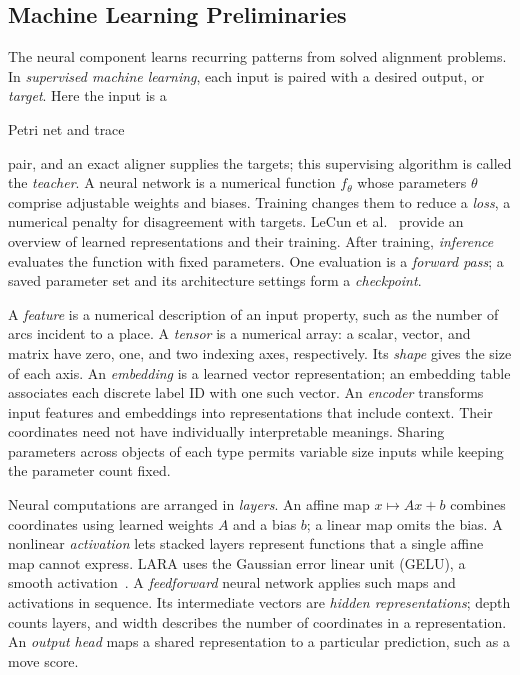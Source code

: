 \subsection{Machine Learning Preliminaries}
\label{sec:mlprelim}

The neural component learns recurring patterns from solved alignment problems. In \emph{supervised machine learning}, each input is paired with a desired output, or \emph{target}. Here the input is a \begin{revised}Petri net and trace\end{revised} pair, and an exact aligner supplies the targets; this supervising algorithm is called the \emph{teacher}. A neural network is a numerical function $f_\theta$ whose parameters $\theta$ comprise adjustable weights and biases. Training changes them to reduce a \emph{loss}, a numerical penalty for disagreement with targets. LeCun et al.~\cite{LeCun2015} provide an overview of learned representations and their training. After training, \emph{inference} evaluates the function with fixed parameters. One evaluation is a \emph{forward pass}; a saved parameter set and its architecture settings form a \emph{checkpoint}.

A \emph{feature} is a numerical description of an input property, such as the number of arcs incident to a place. A \emph{tensor} is a numerical array: a scalar, vector, and matrix have zero, one, and two indexing axes, respectively. Its \emph{shape} gives the size of each axis. An \emph{embedding} is a learned vector representation; an embedding table associates each discrete label ID with one such vector. An \emph{encoder} transforms input features and embeddings into representations that include context. Their coordinates need not have individually interpretable meanings. Sharing parameters across objects of each type permits variable size inputs while keeping the parameter count fixed.

Neural computations are arranged in \emph{layers}. An affine map $x\mapsto Ax+b$ combines coordinates using learned weights $A$ and a bias $b$; a linear map omits the bias. A nonlinear \emph{activation} lets stacked layers represent functions that a single affine map cannot express. LARA uses the Gaussian error linear unit (GELU), a smooth activation~\cite{Hendrycks2016}. A \emph{feedforward} neural network applies such maps and activations in sequence. Its intermediate vectors are \emph{hidden representations}; depth counts layers, and width describes the number of coordinates in a representation. An \emph{output head} maps a shared representation to a particular prediction, such as a move score.

